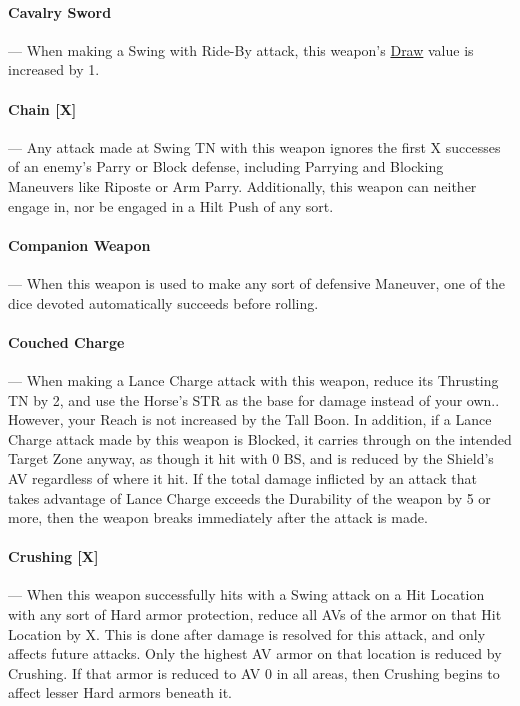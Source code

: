 \documentclass[oneside,11pt,english]{book}
\begin{document}
\paragraph{\label{par:Cavalry Sword}Cavalry Sword}---\quad
When making a Swing with Ride-By attack, this weapon’s \hyperref[par:Draw]{Draw} value is increased by 1.

\paragraph{\label{par:Chain}Chain [X]}---\quad
Any attack made at Swing TN with this weapon ignores the first X successes of an enemy’s Parry or Block defense, including Parrying and Blocking Maneuvers like Riposte or Arm Parry. Additionally, this weapon can neither engage in, nor be engaged in a Hilt Push of any sort.

\paragraph{\label{par:Companion Weapon}Companion Weapon}---\quad
When this weapon is used to make any sort of defensive Maneuver, one of the dice devoted automatically succeeds before rolling.

\paragraph{\label{par:Couched Charge}Couched Charge}---\quad
When making a Lance Charge attack with this weapon, reduce its Thrusting TN by 2, and use the Horse’s STR as the base for damage instead of your own.. However, your Reach is not increased by the Tall Boon. In addition, if a Lance Charge attack made by this weapon is Blocked, it carries through on the intended Target Zone anyway, as though it hit with 0 BS, and is reduced by the Shield’s AV regardless of where it hit. If the total damage inflicted by an attack that takes advantage of Lance Charge exceeds the Durability of the weapon by 5 or more, then the weapon breaks immediately after the attack is made.

\paragraph{\label{par:Crushing}Crushing [X]}---\quad
When this weapon successfully hits with a Swing attack on a Hit Location with any sort of Hard armor protection, reduce all AVs of the armor on that Hit Location by X. This is done after damage is resolved for this attack, and only affects future attacks. Only the highest AV armor on that location is reduced by Crushing. If that armor is reduced to AV 0 in all areas, then Crushing begins to affect lesser Hard armors beneath it. 
\end{document}
